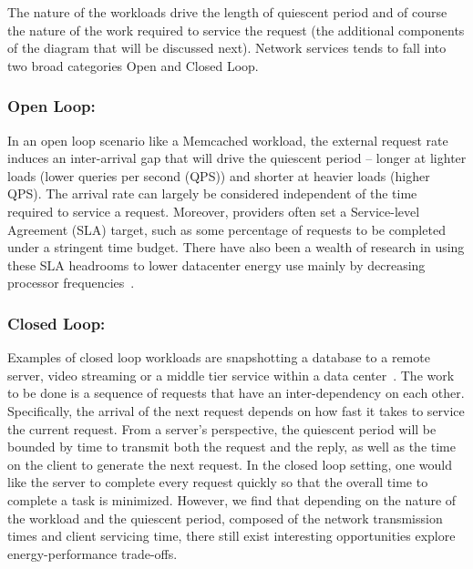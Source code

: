The nature of the workloads drive the length of quiescent period and of course the nature of the work required to service the request (the additional components of the diagram that will be discussed next).  Network services tends to fall into two broad categories Open and Closed Loop.   

\subsubsection{Open Loop:}
\label{sec:workflow:openloop}
In an open loop scenario like a Memcached workload, the external request rate induces an inter-arrival gap that will drive the quiescent period -- longer at lighter loads (lower queries per second (QPS)) and shorter at heavier loads (higher QPS). The arrival rate can largely be considered independent of the time required to service a request. Moreover, providers often set a Service-level Agreement (SLA) target, such as some percentage of requests to be completed under a stringent time budget. There have also been a wealth of research in using these SLA headrooms to lower datacenter energy use mainly by decreasing processor frequencies~\cite{Dynamo, SmoothOperator, oldi-pegasus, adrenaline, heracles, energyproportion, warehouse-power}.

\subsubsection{Closed Loop:}
\label{sec:workflow:closed_loop}
Examples of closed loop workloads are snapshotting a database to a remote server, video streaming or a middle tier service within a data center~\cite{Barroso:2009:DCI:1643608, oldi-study, oldi-pegasus, warehouse-power, energyproportion, WebSearch}.  The work to be done is a sequence of requests that have an inter-dependency on each other. Specifically, the arrival of the next request depends on how fast it takes to service the current request. From a server's perspective, the quiescent period will be bounded by time to transmit both the request and the reply, as well as the time on the client to generate the next request.  
In the closed loop setting, one would like the server to complete every request quickly so that the overall time to complete a task is minimized. However, we find that depending on the nature of the workload and the quiescent period, composed of the network transmission times and client servicing time, there still exist interesting opportunities explore energy-performance trade-offs.

